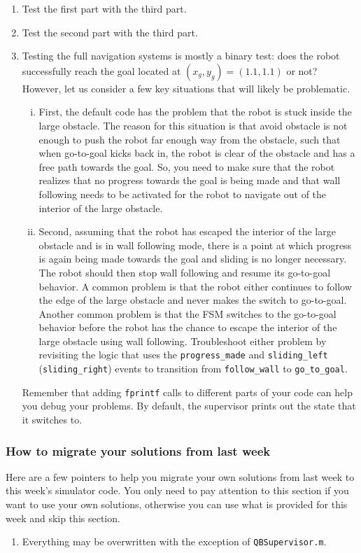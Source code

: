 \documentclass[10pt]{article}
\begin{document}
\begin{enumerate}
  \item Test the first part with the third part.
  \item Test the second part with the third part.
  \item Testing the full navigation systems is mostly a binary test: does the robot successfully reach the goal located at $(x_g,y_g)=(1.1,1.1)$ or not? However, let us consider a few key situations that will likely be problematic.
  \begin{enumerate}[(i)]
    \item First, the default code has the problem that the robot is stuck inside the large obstacle. The reason for this situation is that avoid obstacle is not enough to push the robot far enough way from the obstacle, such that when go-to-goal kicks back in, the robot is clear of the obstacle and has a free path towards the goal. So, you need to make sure that the robot realizes that no progress towards the goal is being made and that wall following needs to be activated for the robot to navigate out of the interior of the large obstacle.
    \item Second, assuming that the robot has escaped the interior of the large obstacle and is in wall following mode, there is a point at which progress is again being made towards the goal and sliding is no longer necessary. The robot should then stop wall following and resume its go-to-goal behavior. A common problem is that the robot either continues to follow the edge of the large obstacle and never makes the switch to go-to-goal. Another common problem is that the FSM switches to the go-to-goal behavior before the robot has the chance to escape the interior of the large obstacle using wall following. Troubleshoot either problem by revisiting the logic that uses the \texttt{progress\_made} and \texttt{sliding\_left} (\texttt{sliding\_right}) events to transition from \texttt{follow\_wall} to \texttt{go\_to\_goal}.
  \end{enumerate}
  Remember that adding \texttt{fprintf} calls to different parts of your code can help you debug your problems. By default, the supervisor prints out the state that it switches to.
\end{enumerate}

\subsubsection*{How to migrate your solutions from last week}
Here are a few pointers to help you migrate your own solutions from last week to this week's simulator code. You only need to pay attention to this section if you want to use your own solutions, otherwise you can use what is provided for this week and skip this section.

\begin{enumerate}
 \item Everything may be overwritten with the exception of \texttt{QBSupervisor.m}.
\end{enumerate}
\end{document}
